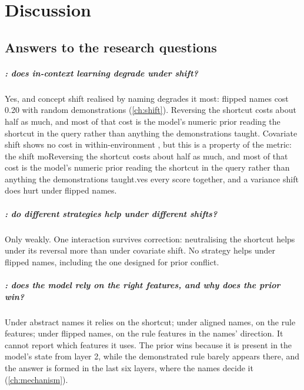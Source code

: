 \chapter{Discussion}
\label{ch:discussion}

\section{Answers to the research questions}

\paragraph{: does in-context learning degrade under shift?}
Yes, and concept shift realised by naming degrades it most: flipped names cost 0.20 \AUROC with random demonstrations (\autoref{ch:shift}).
Reversing the shortcut costs about half as much, and most of that cost is the model's numeric prior reading the shortcut in the query rather than anything the demonstrations taught.
Covariate shift shows no cost in within-environment \AUROC, but this is a property of the metric: the shift moReversing the shortcut costs about half as much, and most of that cost is the model's numeric prior reading the shortcut in the query rather than anything the demonstrations taught.ves every score together, and a variance shift does hurt under flipped names.

\paragraph{: do different strategies help under different shifts?}
Only weakly.
One interaction survives correction: neutralising the shortcut helps under its reversal more than under covariate shift.
No strategy helps under flipped names, including the one designed for prior conflict.

\paragraph{: does the model rely on the right features, and why does the prior win?}
Under abstract names it relies on the shortcut; under aligned names, on the rule features; under flipped names, on the rule features in the names' direction.
It cannot report which features it uses.
The prior wins because it is present in the model's state from layer 2, while the demonstrated rule barely appears there, and the answer is formed in the last six layers, where the names decide it (\autoref{ch:mechanism}).


